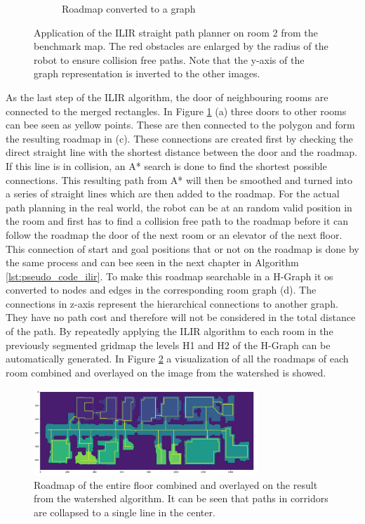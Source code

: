 \begin{figure}[h]
\begin{subfigure}{.25\textwidth}
      \caption{Roadmap converted to a graph}
    \end{subfigure}
    \caption[Application of the ILIR straight path planner on room 2 from the benchmark map]{Application of the ILIR straight path planner on room 2 from the benchmark map. The red obstacles are enlarged by the radius of the robot to ensure collision free paths. Note that the y-axis of the graph representation is inverted to the other images.}
    \label{fig:ilir_room_roadmap}
\end{figure}

As the last step of the ILIR algorithm, the door of neighbouring rooms are connected to the merged rectangles. In Figure \ref{fig:ilir_room_roadmap} (a) three doors to other rooms can bee seen as yellow points. These are then connected to the polygon and form the resulting roadmap in (c). These connections are created first by checking the direct straight line with the shortest distance between the door and the roadmap. If this line is in collision, an A* search is done to find the shortest possible connections. This resulting path from A* will then be smoothed and turned into a series of straight lines which are then added to the roadmap. For the actual path planning in the real world, the robot can be at an random valid position in the room and first has to find a collision free path to the roadmap before it can follow the roadmap the door of the next room or an elevator of the next floor. This connection of start and goal positions that or not on the roadmap is done by the same process and can bee seen in the next chapter in Algorithm \ref{lst:pseudo_code_ilir}. To make this roadmap searchable in a H-Graph it os converted to nodes and edges in the corresponding room graph (d). The connections in z-axis represent the hierarchical connections to another graph. They have no path cost and therefore will not be considered in the total distance of the path. By repeatedly applying the ILIR algorithm to each room in the previously segmented gridmap the levels H1 and H2 of the H-Graph can be automatically generated. In Figure \ref{fig:ryu_roadmap} a visualization of all the roadmaps of each room combined and overlayed on the image from the watershed is showed.

\begin{figure}[h]
    \centering
    \includegraphics[width=0.75\textwidth]{figures/50_implementation/ryu_roadmap.png}
    \caption[Roadmap of the entire floor combined]{Roadmap of the entire floor combined and overlayed on the result from the watershed algorithm. It can be seen that paths in corridors are collapsed to a single line in the center.}
    \label{fig:ryu_roadmap}
\end{figure}

